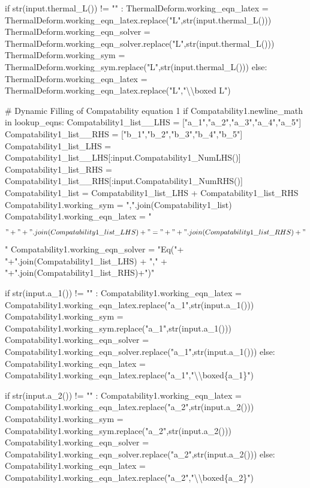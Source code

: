 \documentclass[
  letterpaper,
  DIV=11,
  numbers=noendperiod]{scrreprt}
\newenvironment{Shaded}{\begin{snugshade}}{\end{snugshade}}
\newcommand{\NormalTok}[1]{\textcolor[rgb]{0.00,0.23,0.31}{#1}}
\begin{document}
\begin{Shaded}
\begin{Highlighting}[]
\NormalTok{            if str(input.thermal\_L()) != "" : }
\NormalTok{                ThermalDeform.working\_eqn\_latex = ThermalDeform.working\_eqn\_latex.replace("L",str(input.thermal\_L()))}
\NormalTok{                ThermalDeform.working\_eqn\_solver = ThermalDeform.working\_eqn\_solver.replace("L",str(input.thermal\_L()))}
\NormalTok{                ThermalDeform.working\_sym = ThermalDeform.working\_sym.replace("L",str(input.thermal\_L()))}
\NormalTok{            else:}
\NormalTok{                ThermalDeform.working\_eqn\_latex = ThermalDeform.working\_eqn\_latex.replace("L","\textbackslash{}\textbackslash{}boxed L")}
        
        
\NormalTok{        \# Dynamic Filling of Compatability equation 1 }
\NormalTok{        if Compatability1.newline\_math in lookup\_eqns:}
\NormalTok{            Compatability1\_list\_\_LHS = ["a\_1","a\_2","a\_3","a\_4","a\_5"]}
\NormalTok{            Compatability1\_list\_\_RHS = ["b\_1","b\_2","b\_3","b\_4","b\_5"]}
\NormalTok{            Compatability1\_list\_LHS = Compatability1\_list\_\_LHS[:input.Compatability1\_NumLHS()]}
\NormalTok{            Compatability1\_list\_RHS = Compatability1\_list\_\_RHS[:input.Compatability1\_NumRHS()]}
\NormalTok{            Compatability1\_list = Compatability1\_list\_LHS + Compatability1\_list\_RHS}
\NormalTok{            Compatability1.working\_sym = ",".join(Compatability1\_list)}
\NormalTok{            Compatability1.working\_eqn\_latex = "$$" + "+".join(Compatability1\_list\_LHS) + "=" + "+".join(Compatability1\_list\_RHS)+"$$"}
\NormalTok{            Compatability1.working\_eqn\_solver = "Eq("+ "+".join(Compatability1\_list\_LHS) + "," + "+".join(Compatability1\_list\_RHS)+")"}
            
\NormalTok{            if str(input.a\_1()) != "" : }
\NormalTok{                Compatability1.working\_eqn\_latex = Compatability1.working\_eqn\_latex.replace("a\_1",str(input.a\_1()))}
\NormalTok{                Compatability1.working\_sym = Compatability1.working\_sym.replace("a\_1",str(input.a\_1()))}
\NormalTok{                Compatability1.working\_eqn\_solver = Compatability1.working\_eqn\_solver.replace("a\_1",str(input.a\_1()))}
\NormalTok{            else:}
\NormalTok{                Compatability1.working\_eqn\_latex = Compatability1.working\_eqn\_latex.replace("a\_1","\textbackslash{}\textbackslash{}boxed\{a\_1\}")}
            
\NormalTok{            if str(input.a\_2()) != "" : }
\NormalTok{                Compatability1.working\_eqn\_latex = Compatability1.working\_eqn\_latex.replace("a\_2",str(input.a\_2()))}
\NormalTok{                Compatability1.working\_sym = Compatability1.working\_sym.replace("a\_2",str(input.a\_2()))}
\NormalTok{                Compatability1.working\_eqn\_solver = Compatability1.working\_eqn\_solver.replace("a\_2",str(input.a\_2()))}
\NormalTok{            else:}
\NormalTok{                Compatability1.working\_eqn\_latex = Compatability1.working\_eqn\_latex.replace("a\_2","\textbackslash{}\textbackslash{}boxed\{a\_2\}")}
            

\end{Highlighting}
\end{Shaded}
\end{document}
